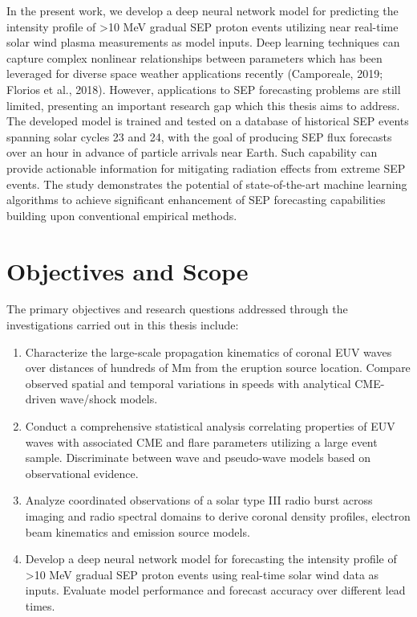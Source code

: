 In the present work, we develop a deep neural network model for predicting the intensity profile of >10 MeV gradual SEP proton events utilizing near real-time solar wind plasma measurements as model inputs. Deep learning techniques can capture complex nonlinear relationships between parameters which has been leveraged for diverse space weather applications recently (Camporeale, 2019; Florios et al., 2018). However, applications to SEP forecasting problems are still limited, presenting an important research gap which this thesis aims to address. The developed model is trained and tested on a database of historical SEP events spanning solar cycles 23 and 24, with the goal of producing SEP flux forecasts over an hour in advance of particle arrivals near Earth. Such capability can provide actionable information for mitigating radiation effects from extreme SEP events. The study demonstrates the potential of state-of-the-art machine learning algorithms to achieve significant enhancement of SEP forecasting capabilities building upon conventional empirical methods.


\section{Objectives and Scope}
The primary objectives and research questions addressed through the investigations carried out in this thesis include:

\begin{enumerate}
    \item Characterize the large-scale propagation kinematics of coronal EUV waves over distances of hundreds of Mm from the eruption source location. Compare observed spatial and temporal variations in speeds with analytical CME-driven wave/shock models.
    \item Conduct a comprehensive statistical analysis correlating properties of EUV waves with associated CME and flare parameters utilizing a large event sample. Discriminate between wave and pseudo-wave models based on observational evidence.
    \item Analyze coordinated observations of a solar type III radio burst across imaging and radio spectral domains to derive coronal density profiles, electron beam kinematics and emission source models.
    \item Develop a deep neural network model for forecasting the intensity profile of >10 MeV gradual SEP proton events using real-time solar wind data as inputs. Evaluate model performance and forecast accuracy over different lead times.
\end{enumerate}

